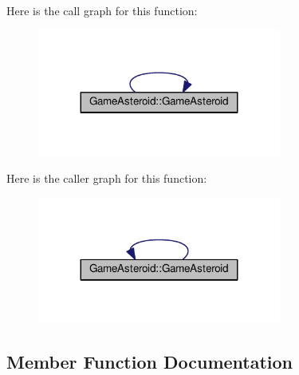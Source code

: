Here is the call graph for this function\+:
\nopagebreak
\begin{figure}[H]
\begin{center}
\leavevmode
\includegraphics[width=227pt]{de/db6/classGameAsteroid_aa1dfce4ffca3206f2ead9e84d494358e_cgraph}
\end{center}
\end{figure}




Here is the caller graph for this function\+:
\nopagebreak
\begin{figure}[H]
\begin{center}
\leavevmode
\includegraphics[width=227pt]{de/db6/classGameAsteroid_aa1dfce4ffca3206f2ead9e84d494358e_icgraph}
\end{center}
\end{figure}




\subsection{Member Function Documentation}

